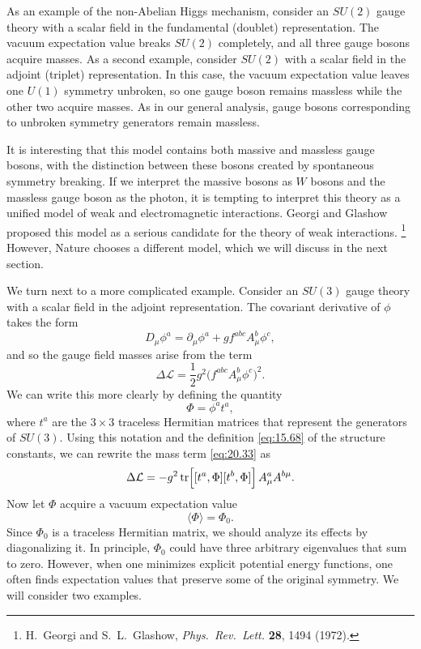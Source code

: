 As an example of the non-Abelian Higgs mechanism, consider an $SU(2)$ gauge
theory with a scalar field in the fundamental (doublet) representation.  The
vacuum expectation value breaks $SU(2)$ completely, and all three gauge
bosons acquire masses.  As a second example, consider $SU(2)$ with a scalar
field in the adjoint (triplet) representation.  In this case, the vacuum
expectation value leaves one $U(1)$ symmetry unbroken, so one gauge boson
remains massless while the other two acquire masses.  As in our general
analysis, gauge bosons corresponding to unbroken symmetry generators remain
massless.

It is interesting that this model contains both massive and massless gauge
bosons, with the distinction between these bosons created by spontaneous
symmetry breaking.  If we interpret the massive bosons as $W$ bosons and the
massless gauge boson as the photon, it is tempting to interpret this theory as
a unified model of weak and electromagnetic interactions.  Georgi and Glashow
proposed this model as a serious candidate for the theory of weak
interactions.%
\footnote{H.~Georgi and S.~L.~Glashow, \emph{Phys.\ Rev.\ Lett.} \textbf{28},
1494 (1972).}  However, Nature chooses a different model, which we will
discuss in the next section.

We turn next to a more complicated example.  Consider an $SU(3)$ gauge
theory with a scalar field in the adjoint representation.  The covariant
derivative of $\phi$ takes the form
\begin{equation}
  D_\mu\phi^a = \partial_\mu\phi^a + gf^{abc}A^b_\mu\phi^c ,
  \label{eq:20.32}
\end{equation}
and so the gauge field masses arise from the term
\begin{equation}
  \Delta\mathcal{L} = \frac{1}{2}g^2\bigl( f^{abc}A^b_\mu\phi^c \bigr)^2 .
  \label{eq:20.33}
\end{equation}
We can write this more clearly by defining the quantity
\begin{equation}
  \Phi = \phi^a t^a ,
  \label{eq:20.34}
\end{equation}
where $t^a$ are the $3\times3$ traceless Hermitian matrices that represent the
generators of $SU(3)$.  Using this notation and the definition \eqref{eq:15.68}
of the structure constants, we can rewrite the mass term \eqref{eq:20.33} as
\begin{equation}
  \Delta\mathcal{L} = -g^2\,\mathrm{tr}\Bigl[ [t^a,\Phi][t^b,\Phi] \Bigr]\,
    A^a_\mu A^{b\mu} .
  \label{eq:20.35}
\end{equation}
Now let $\Phi$ acquire a vacuum expectation value
\begin{equation}
  \langle\Phi\rangle = \Phi_0 .
  \label{eq:20.36}
\end{equation}
Since $\Phi_0$ is a traceless Hermitian matrix, we should analyze its effects
by diagonalizing it.  In principle, $\Phi_0$ could have three arbitrary
eigenvalues that sum to zero.  However, when one minimizes explicit potential
energy functions, one often finds expectation values that preserve some of the
original symmetry.  We will consider two examples.

